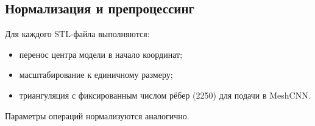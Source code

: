 \subsection{Нормализация и препроцессинг}
Для каждого STL-файла выполняются:
\begin{itemize}
    \item перенос центра модели в начало координат;
    \item масштабирование к единичному размеру;
    \item триангуляция с фиксированным числом рёбер (2250) для подачи в MeshCNN.
\end{itemize}
Параметры операций нормализуются аналогично.

